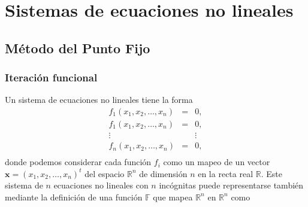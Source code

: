 \chapter{Sistemas de ecuaciones no lineales}


\section{Método del Punto Fijo}
\subsection{Iteración funcional}

Un sistema de ecuaciones no lineales tiene la forma
\begin{equation}
	\begin{matrix}
		f_1(x_1,x_2,\dots,x_n) & = & 0,\\
		f_1(x_1,x_2,\dots,x_n) & = & 0,\\
		\vdots & & \vdots\\
		f_n(x_1,x_2,\dots,x_n) & = & 0,\\	
	\end{matrix}
	\label{eq:SNLpuntoFijo1} 	
\end{equation}
donde podemos considerar cada función $f_i$ como un mapeo de un vector $\textbf{x}=(x_1,x_2,\dots,x_n)^t$ del espacio $\mathbb{R}^n$ de dimensión
$n$ en la recta real $\mathbb{R}$. 
Este sistema de $n$ ecuaciones no lineales con $n$ incógnitas puede representarse también mediante la definición de una función $\mathbb{F}$ que
mapea $\mathbb{R}^n$ en $\mathbb{R}^n$ como
 

